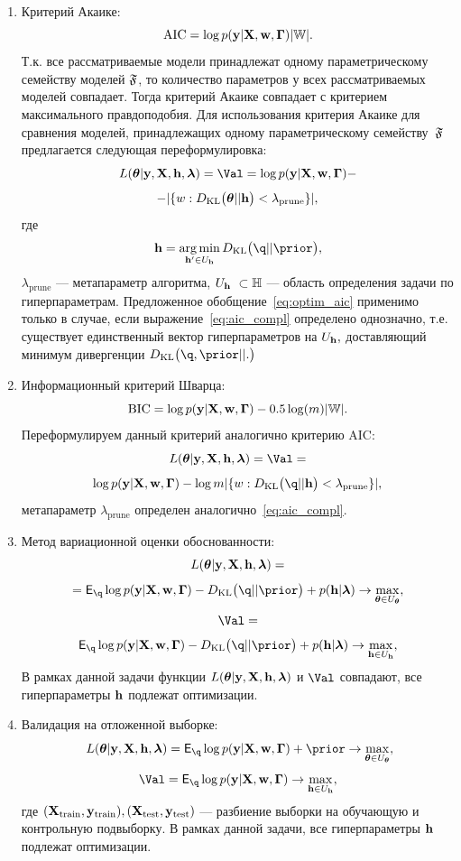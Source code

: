 \begin{enumerate}
\item Критерий Акаике:
\[
   \text{AIC} =  \log p(\mathbf{y}|\mathbf{X}, \mathbf{w}, \boldsymbol{\Gamma}) |\mathbb{W}|.
\]
Т.к. все рассматриваемые модели принадлежат одному параметрическому семейству моделей $\mathfrak{F}$, то количество параметров у всех рассматриваемых моделей  совпадает. Тогда критерий Акаике совпадает с критерием максимального правдоподобия. Для использования критерия Акаике для сравнения моделей, принадлежащих одному параметрическому семейству~$\mathfrak{F}$ предлагается следующая переформулировка:
\begin{equation}
\label{eq:optim_aic}
    \Loss = \Val = \log \LL - 
\end{equation}
\[
 - |\{w: D_\text{KL}\bigl(\boldsymbol{\theta} || \mathbf{h}\bigr)<\lambda_\text{prune}\}|,
\]
где 
\begin{equation}\label{eq:aic_compl}\h=\argmin_{\h' \in \Uh} \KL{\q}{\prior},\end{equation} $\lambda_{\text{prune}}$ --- метапараметр алгоритма, $\Uh  \subset \Hb$ --- область определения задачи по гиперпараметрам. Предложенное обобщение~\eqref{eq:optim_aic} применимо только в случае, если выражение~\eqref{eq:aic_compl} определено однозначно, т.е. существует единственный вектор гиперпараметров на $U_{\mathbf{h}},$ доставляющий минимум дивергенции $\KL{\q,\prior}.$

\item Информационный критерий Шварца:
\[
    \text{BIC} = \log p(\mathbf{y}|\mathbf{X}, \mathbf{w}, \boldsymbol{\Gamma}) -0.5\log(m)|\mathbb{W}|.
\]
Переформулируем данный критерий аналогично критерию AIC:
\begin{equation}
\label{eq:optim_bic}
    \Loss = \Val =  
\end{equation}
\[
\log \LL - \log m |\{w: \KL{\q}{\h}<\lambda_{\text{prune}}\}|,
\]
метапараметр $\lambda_{\text{prune}}$ определен аналогично~\eqref{eq:aic_compl}.

\item Метод вариационной оценки обоснованности:
\begin{equation}
\label{eq:optim_elbo_method}   
    L(\boldsymbol{\theta} |\mathbf{y},\mathbf{X},\mathbf{h},\boldsymbol{\lambda}) = 
\end{equation}
\[
= \E_{\q} \log \LL - \KL{\q}{\prior} + \priorh \to \max_{\teta \in \Uteta},
\]
\[
     \Val = 
\]
\[
\E_{\q} \log \LL - \KL{\q}{\prior} + \priorh \to \max_{\h \in \Uh},
\]
В рамках данной задачи функции $L(\boldsymbol{\theta} |\mathbf{y},\mathbf{X},\mathbf{h},\boldsymbol{\lambda})$ и $\Val$ совпадают, все гиперпараметры $\mathbf{h}$ подлежат оптимизации.

\item Валидация на отложенной выборке:
\begin{equation}
\label{eq:optim_hold_out}
    \Loss = \E_{\q} \log \LL + \prior \to \max_{\teta \in \Uteta},
\end{equation}
\[
    \Val = \E_{\q} \log \LL \to \max_{\h \in \Uh},
\]
где $(\mathbf{X}_\text{train}, \mathbf{y}_\text{train}), (\mathbf{X}_\text{test}, \mathbf{y}_\text{test})$ --- разбиение выборки на обучающую и контрольную подвыборку.
В рамках данной задачи, все гиперпараметры $\mathbf{h}$ подлежат оптимизации.

\end{enumerate}

